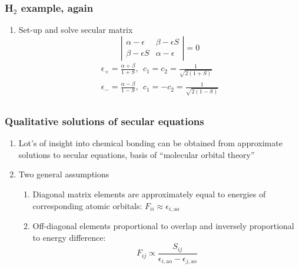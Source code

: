 \documentclass[11pt]{article}
\begin{document}
\subsubsection{H\(_2\) example, again}
\label{sec:org1cdb3fd}
\begin{enumerate}
\item Set-up and solve secular matrix
\begin{displaymath}
 \left | \begin{array}{cc}
     \alpha-\epsilon & \beta-\epsilon S \\
     \beta - \epsilon S & \alpha-\epsilon
     \end{array} \right | = 0
\end{displaymath}
\begin{eqnarray*}
	\epsilon_+=\frac{\alpha+\beta}{1+S},\ \ c_1=c_2=\frac{1}{\sqrt{2(1+S)}} \\
	\epsilon_-=\frac{\alpha-\beta}{1-S},\ \ c_1=-c_2=\frac{1}{\sqrt{2(1-S)}} \\
\end{eqnarray*}
\end{enumerate}
\subsubsection{Qualitative solutions of secular equations}
\label{sec:org005210a}
\begin{enumerate}
\item Lot's of insight into chemical bonding can be obtained from approximate solutions to secular equations, basis of ``molecular orbital theory''
\item Two general assumptions
\begin{enumerate}
\item Diagonal matrix elements are approximately equal to energies of corresponding atomic orbitals: \(F_{ii} \approx \epsilon_{i,\mathrm{ao}}\)
\item Off-diagonal elements proportional to overlap and inversely proportional to energy difference:
\begin{displaymath}
  F_{ij} \propto \frac{S_{ij}}{\epsilon_{i,\mathrm{ao}}-\epsilon_{j,\mathrm{ao}}}
\end{displaymath}
\end{enumerate}
\end{enumerate}
\end{document}

